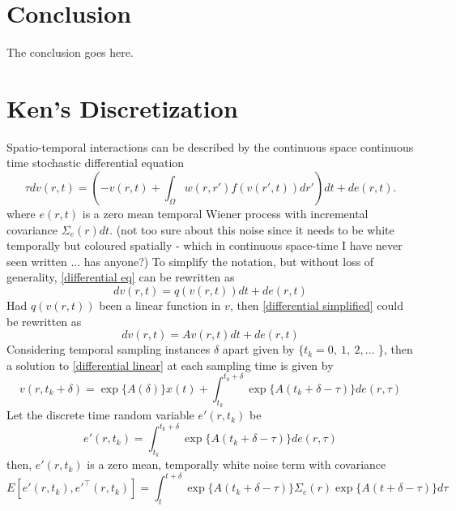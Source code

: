 \documentclass[onecolumn,draftcls]{IEEEtran}
\begin{document}

\section{Conclusion}
The conclusion goes here.

\appendices
\section{Ken's Discretization}
Spatio-temporal interactions can be described by the continuous space continuous time stochastic differential equation
\begin{equation}\label{differential eq}	
\tau dv\left( r,t \right) = \left( -v\left( r,t \right) + \int_\Omega  {w\left( r,r' \right)f\left( {v\left( r',t \right)} \right)dr'} \right) dt  + d e\left( r,t \right).
\end{equation}
where $e\left( r,t \right)$ is a zero mean temporal Wiener process with incremental covariance $\Sigma_e(r)dt$. (not too sure about this noise since it needs to be white temporally but coloured spatially - which in continuous space-time I have never seen written ... has anyone?)
To simplify the notation, but without loss of generality, \ref{differential eq} can be rewritten as
\begin{equation}\label{differential simplified}
	dv\left( r,t \right) = q\left(v(r,t) \right) dt  + d e\left( r,t \right)
\end{equation}
Had $q\left(v(r,t) \right)$ been a linear function in $v$, then \ref{differential simplified} could be rewritten as
\begin{equation}\label{differential linear}
	dv\left( r,t \right) = Av(r,t)dt  + d e\left( r,t \right)
\end{equation}
Considering temporal sampling instances $\delta$ apart given by $\{t_k = 0,~1,~2, \ldots$ \}, then a solution to \ref{differential linear} at each sampling time is given by
\begin{equation}\label{linear solution}
	v(r,t_k+\delta) = \exp\{A(\delta)\}x(t) + \int_{t_k}^{t_k+\delta}\exp\{A(t_k+\delta-\tau)\}de(r,\tau)
\end{equation}
Let the discrete time random variable $e'(r,t_k)$ be
\begin{equation}\label{discrete noise}
	e'(r,t_k) = \int_{t_k}^{t_k+\delta}\exp\{A(t_k+\delta-\tau)\}de(r,\tau)
\end{equation}
then, $e'(r,t_k)$ is a zero mean, temporally white noise term with covariance
\begin{equation}\label{covariance of noise}
	E\left[e'(r,t_k),e'^\top(r,t_k) \right] = \int_t^{t+\delta}\exp\{A(t_k+\delta-\tau)\} \Sigma_e(r) \exp\{A(t+\delta-\tau)\} d\tau
\end{equation}
\end{document}
